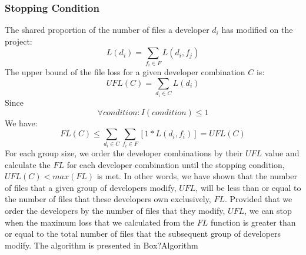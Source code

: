 \documentclass[12pt, a4paper, openright]{report}
\begin{document}
\subsubsection{Stopping Condition}
The shared proportion of the number of files a developer $d_i$ has modified on the project:
\begin{equation} L(d_i) = \sum_{f_i \in F} L(d_{i},f_{j}) \end{equation}
The upper bound of the file loss for a given developer combination $C$ is:
\begin{equation} UFL(C) = \sum_{d_i \in C}L(d_i) \end{equation}
Since \[\forall condition: I(condition) \leq 1 \]
We have:
\begin{equation} FL(C) \leq \sum_{d_i \in C} \sum_{f_i \in F} [1 * L(d_i,f_i)] = UFL(C)\end{equation}
For each group size, we order the developer combinations by their $UFL$ value and calculate the $FL$ for each developer combination until the stopping condition, $UFL(C)<max(FL)$ is met.
In other words, we have shown that the number of files that a given group of developers modify, $UFL$, will be less than or equal to the number of files that these developers own exclusively, $FL$. Provided that we order the developers by the number of files that they modify, $UFL$, we can stop when the maximum loss that we calculated from the $FL$ function is greater than or equal to the total number of files that the subsequent group of developers modify. The algorithm is presented in Box?Algorithm
\end{document}
